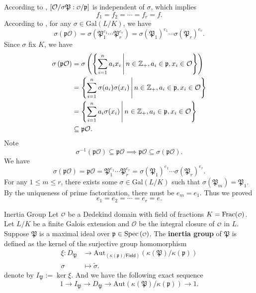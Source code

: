 \begin{prf}
    According to , $[\mathcal{O}/\sigma\mathfrak{P}:\mathcalo/\mathfrak{p}]$ is independent of $\sigma$, which implies 
    \[
    f_1=f_2=\cdots=f_r=f.
    \]
    According to , for any $\sigma\in \mathrm{Gal}(L/K)$, we have
    \[
    \sigma\left(\mathfrak{p}\mathcal{O}\right)=\sigma\left(\mathfrak{P}_1^{e_1}\cdots\mathfrak{P}_r^{e_r}\right)=\sigma\left(\mathfrak{P}_1\right)^{e_1}\cdots\sigma\left(\mathfrak{P}_r\right)^{e_r}.
    \]
    Since $\sigma$ fix $K$, we have
    \begin{align*}
        \sigma\left(\mathfrak{p}\mathcal{O}\right)&=\sigma\left(\left\{ \sum_{i=1}^n a_ix_i \,\middle\vert\, n\in\mathbb{Z}_+,a_i\in \mathfrak{p}, x_i\in \mathcal{O}\right\}\right)\\
        &=\left\{ \sum_{i=1}^n \sigma(a_i)\sigma(x_i) \,\middle\vert\, n\in\mathbb{Z}_+,a_i\in \mathfrak{p}, x_i\in \mathcal{O}\right\}\\
        &=\left\{ \sum_{i=1}^n a_i\sigma(x_i) \,\middle\vert\, n\in\mathbb{Z}_+,a_i\in \mathfrak{p}, x_i\in \mathcal{O}\right\}\\
        &\subseteq \mathfrak{p}\mathcal{O}.
    \end{align*}
    Note 
    \[
    \sigma^{-1}\left(\mathfrak{p}\mathcal{O}\right)\subseteq \mathfrak{p}\mathcal{O}\implies \mathfrak{p}\mathcal{O}\subseteq \sigma\left(\mathfrak{p}\mathcal{O}\right).
    \]
    We have 
    \[
    \sigma\left(\mathfrak{p}\mathcal{O}\right)=\mathfrak{p}\mathcal{O}= \mathfrak{P}_1^{e_1}\cdots\mathfrak{P}_r^{e_r}=\sigma\left(\mathfrak{P}_1\right)^{e_1}\cdots\sigma\left(\mathfrak{P}_r\right)^{e_r}.
    \]
    For any $1\le m\le r$, there exists some $\sigma \in \mathrm{Gal}(L/K)$ such that $\sigma\left(\mathfrak{P}_m\right)=\mathfrak{P}_1$. By the uniqueness of prime factorization, there must be $e_m=e_1$. Thus we proved
    \[
    e_1=e_2=\cdots=e_r=e.
    \]
\end{prf}

\begin{definition}{Inertia Group}{}
    Let $\mathcalo$ be a Dedekind domain with field of fractions $K=\mathrm{Frac}(\mathcalo)$. Let $L/K$ be a finite Galois extension and $\mathcal{O}$ be the integral closure of $\mathcalo$ in $L$. Suppose $\mathfrak{P}$ is a maximal ideal over $\mathfrak{p}\in \spec\left(\mathcalo\right)$. The \textbf{inertia group} of $\mathfrak{P}$ is defined as the kernel of the surjective group homomorphism
    \begin{align*}
        \xi:D_{\mathfrak{P}}&\longrightarrow \mathrm{Aut}_{\left(\kappa(\mathfrak{p})/\mathsf{Field}\right)}\left(\kappa(\mathfrak{P})/\kappa(\mathfrak{p})\right)\\
        \sigma&\longmapsto \widetilde{\sigma}.
    \end{align*}
    denote by $I_{\mathfrak{P}}:=\ker \xi$. And we have the following exact sequence
    \[
    1\longrightarrow I_{\mathfrak{P}}\longrightarrow D_{\mathfrak{P}}\longrightarrow \mathrm{Aut}\left(\kappa(\mathfrak{P})/\kappa(\mathfrak{p})\right)\longrightarrow 1.
    \]
\end{definition}


